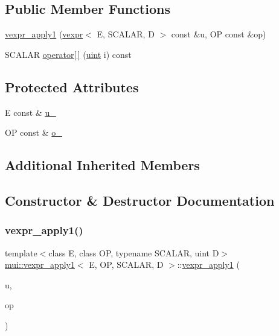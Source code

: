 \subsection*{Public Member Functions}
\begin{DoxyCompactItemize}
\item 
\hyperlink{structmui_1_1vexpr__apply1_a693aa7ef98eebb55c27e8b8aceae77c6}{vexpr\+\_\+apply1} (\hyperlink{structmui_1_1vexpr}{vexpr}$<$ E, S\+C\+A\+L\+AR, D $>$ const \&u, OP const \&op)
\item 
S\+C\+A\+L\+AR \hyperlink{structmui_1_1vexpr__apply1_aacf9277f3f001a6c4870c5ebdf4b6395}{operator\mbox{[}$\,$\mbox{]}} (\hyperlink{namespacemui_af15a3e7188a2117fb9965277bb0cacd2}{uint} i) const
\end{DoxyCompactItemize}
\subsection*{Protected Attributes}
\begin{DoxyCompactItemize}
\item 
E const  \& \hyperlink{structmui_1_1vexpr__apply1_a3b939200baed0b2c6838a41704b2fa2d}{u\+\_\+}
\item 
OP const  \& \hyperlink{structmui_1_1vexpr__apply1_ac876a26885617eb0188d4c22bd0531ff}{o\+\_\+}
\end{DoxyCompactItemize}
\subsection*{Additional Inherited Members}


\subsection{Constructor \& Destructor Documentation}
\mbox{\label{structmui_1_1vexpr__apply1_a693aa7ef98eebb55c27e8b8aceae77c6}} 
\subsubsection{\texorpdfstring{vexpr\+\_\+apply1()}{vexpr\_apply1()}}
{\footnotesize\ttfamily template$<$class E, class OP, typename S\+C\+A\+L\+AR, uint D$>$ \\
\hyperlink{structmui_1_1vexpr__apply1}{mui\+::vexpr\+\_\+apply1}$<$ E, OP, S\+C\+A\+L\+AR, D $>$\+::\hyperlink{structmui_1_1vexpr__apply1}{vexpr\+\_\+apply1} (\begin{DoxyParamCaption}\item[{\hyperlink{structmui_1_1vexpr}{vexpr}$<$ E, S\+C\+A\+L\+AR, D $>$ const \&}]{u,  }\item[{OP const \&}]{op }\end{DoxyParamCaption})\hspace{0.3cm}{\ttfamily [inline]}}



